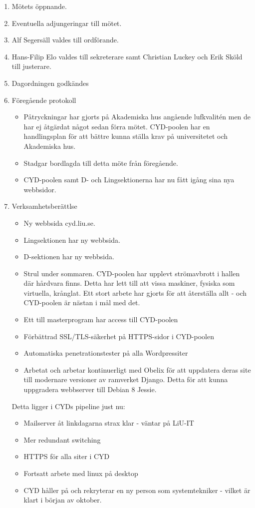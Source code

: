 \documentclass[a4paper,12pt]{article}
\begin{document}
\begin{enumerate}
\item Mötets öppnande.
\item Eventuella adjungeringar till mötet.
\item Alf Segersäll valdes till ordförande.
\item Hans-Filip Elo valdes till sekreterare samt Christian Luckey och Erik Sköld till justerare.
\item Dagordningen godkändes
\item Föregående protokoll
  \begin{itemize}
  \item Påtryckningar har gjorts på Akademiska hus angående lufkvalitén men de har ej åtgärdat något sedan förra mötet. CYD-poolen har en handlingsplan för att bättre kunna ställa krav på universitetet och Akademiska hus.
  \item Stadgar bordlagda till detta möte från föregående.
  \item CYD-poolen samt D- och Lingsektionerna har nu fått igång sina nya webbsidor.
  \end{itemize}
\item Verksamhetsberättlse
  \begin{itemize}
    \item Ny webbsida cyd.liu.se.
    \item Lingsektionen har ny webbsida.
    \item D-sektionen har ny webbsida.
    \item Strul under sommaren. CYD-poolen har upplevt strömavbrott i hallen där hårdvara finns. Detta har lett till att vissa maskiner, fysiska som virtuella, krånglat. Ett stort arbete har gjorts för att återställa allt - och CYD-poolen är nästan i mål med det.
    \item Ett till masterprogram har access till CYD-poolen
    \item Förbättrad SSL/TLS-säkerhet på HTTPS-sidor i CYD-poolen
    \item Automatiska penetrationstester på alla Wordpressiter
    \item Arbetat och arbetar kontinuerligt med Obelix för att uppdatera deras site till modernare versioner av ramverket Django. Detta för att kunna uppgradera webbserver till Debian 8 Jessie.
  \end{itemize}
  Detta ligger i CYDs pipeline just nu:
  \begin{itemize}
    \item Mailserver åt linkdagarna strax klar - väntar på LiU-IT
    \item Mer redundant switching
    \item HTTPS för alla siter i CYD
    \item Fortsatt arbete med linux på desktop
    \item CYD håller på och rekryterar en ny person som systemtekniker - vilket är klart i början av oktober.
  \end{itemize}


\end{enumerate}
\end{document}
